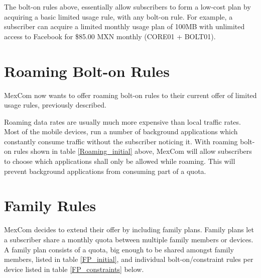 The bolt-on rules above, essentially allow subscribers to form a low-cost plan by acquiring a basic limited usage rule, with any bolt-on rule. For example, a subscriber can acquire a limited monthly usage plan of 100MB with unlimited access to Facebook for {\$}85.00 MXN monthly (CORE01 + BOLT01).  

\section{Roaming Bolt-on Rules}
\noindent
MexCom now wants to offer roaming bolt-on rules to their current offer of limited usage rules, previously described. \\

\begin{table}[H]
\begin{center}
\end{center}
\caption{Roaming Bolt-on Rules}
\label{Roaming_initial}
\end{table}

Roaming data rates are usually much more expensive than local traffic rates. Most of the mobile devices, run a number of background applications which constantly consume traffic without the subscriber noticing it. With roaming bolt-on rules shown in table \ref{Roaming_initial} above, MexCom will allow subscribers to choose which applications shall only be allowed while roaming. This will prevent background applications from consuming part of a quota. 

\section{Family Rules}
\noindent
MexCom decides to extend their offer by including family plans. Family plans let a subscriber share a monthly quota between multiple family members or devices. A family plan consists of a quota, big enough to be shared amongst family members,  listed in table \ref{FP_initial}, and individual bolt-on/constraint rules per device listed in table \ref{FP_constraints} below. \\


